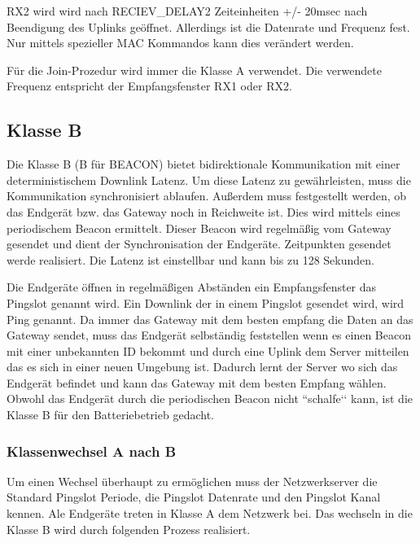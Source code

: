 \documentclass[a4paper,12pt]{article}
\begin{document}
            RX2 wird wird nach RECIEV\_DELAY2 Zeiteinheiten +/- 20msec nach Beendigung des Uplinks geöffnet. Allerdings
            ist die Datenrate und Frequenz fest. Nur mittels spezieller MAC Kommandos kann dies verändert werden.
            
            Für die Join-Prozedur wird immer die Klasse A verwendet. Die verwendete Frequenz entspricht der 
            Empfangsfenster RX1 oder RX2.
        \subsection{Klasse B}
            Die Klasse B (B für BEACON) bietet bidirektionale Kommunikation mit einer deterministischem Downlink Latenz.
            Um diese Latenz zu gewährleisten, muss die Kommunikation synchronisiert ablaufen. Außerdem muss 
            festgestellt werden, ob das Endgerät bzw. das Gateway noch in Reichweite ist. Dies wird mittels eines 
            periodischem Beacon ermittelt. Dieser Beacon wird regelmäßig vom Gateway gesendet und dient der 
            Synchronisation der Endgeräte. Zeitpunkten gesendet werde realisiert. Die Latenz ist einstellbar und kann 
            bis zu 128 Sekunden.\cite[S.66 ff.]{LoRaSpec}

            Die Endgeräte öffnen in regelmäßigen Abständen ein Empfangsfenster das Pingslot genannt wird. Ein Downlink 
            der in einem Pingslot gesendet wird, wird Ping genannt. Da immer das Gateway mit dem besten empfang die 
            Daten an das Gateway sendet, muss das Endgerät selbständig feststellen wenn es einen Beacon mit einer 
            unbekannten ID bekommt und durch eine Uplink dem Server mitteilen das es sich in einer neuen Umgebung ist. 
            Dadurch lernt der Server wo sich das Endgerät befindet und kann das Gateway mit dem besten Empfang wählen.
            Obwohl das Endgerät durch die periodischen Beacon nicht ``schalfe‘‘ kann, ist die Klasse B für den 
            Batteriebetrieb gedacht.

            \subsubsection{Klassenwechsel A nach B}
                Um einen Wechsel überhaupt zu ermöglichen muss der Netzwerkserver die Standard Pingslot Periode, die 
                Pingslot Datenrate und den Pingslot Kanal kennen. Ale Endgeräte treten in Klasse A dem Netzwerk bei. 
                Das wechseln in die Klasse B wird durch folgenden Prozess realisiert.
\end{document}
